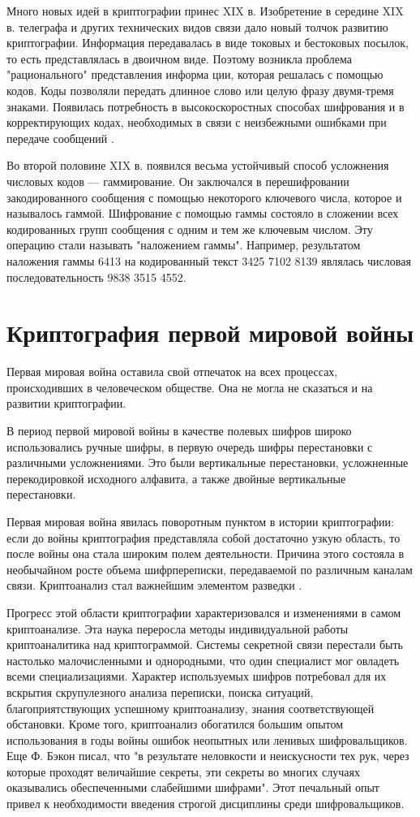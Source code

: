 Много новых идей в криптографии принес XIX в. Изобретение в середине XIX в. телеграфа и других технических видов связи дало новый толчок развитию криптографии. Информация передавалась в виде токовых и бестоковых посылок, то есть представлялась в двоичном виде. Поэтому возникла проблема "рационального" представления информа ции, которая решалась с помощью кодов. Коды позволяли передать длинное слово или целую фразу двумя-тремя знаками. Появилась потребность в высокоскоростных способах шифрования и в корректирующих кодах, необходимых в связи с неизбежными ошибками при передаче сообщений \cite{omran2011cryptanalytic}.

Во второй половине XIX в. появился весьма устойчивый способ усложнения числовых кодов — гаммирование. Он заключался в перешифровании закодированного сообщения с помощью некоторого ключевого числа, которое и называлось гаммой. Шифрование с помощью гаммы состояло в сложении всех кодированных групп сообщения с одним и тем же ключевым числом. Эту операцию стали называть "наложением гаммы". Например, результатом наложения гаммы 6413 на кодированный текст 3425 7102 8139 являлась числовая последовательность 9838 3515 4552.


\section{Криптография первой мировой войны}
Первая мировая война оставила свой отпечаток на всех процессах, происходивших в человеческом обществе. Она не могла не сказаться и на развитии криптографии.

В период первой мировой войны в качестве полевых шифров широко использовались ручные шифры, в первую очередь шифры перестановки с различными усложнениями. Это были вертикальные перестановки, усложненные перекодировкой исходного алфавита, а также двойные вертикальные перестановки.

Первая мировая война явилась поворотным пунктом в истории криптографии: если до войны криптография представляла собой достаточно узкую область, то после войны она стала широким полем деятельности. Причина этого состояла в необычайном росте объема шифрпереписки, передаваемой по различным каналам связи. Криптоанализ стал важнейшим элементом разведки \cite{d2006sov}.

Прогресс этой области криптографии характеризовался и изменениями в самом криптоанализе. Эта наука переросла методы индивидуальной работы криптоаналитика над криптограммой. Системы секретной связи перестали быть настолько малочисленными и однородными, что один специалист мог овладеть всеми специализациями. Характер используемых шифров потребовал для их вскрытия скрупулезного анализа переписки, поиска ситуаций, благоприятствующих успешному криптоанализу, знания соответствующей обстановки. Кроме того, криптоанализ обогатился большим опытом использования в годы войны ошибок неопытных или ленивых шифровальщиков. Еще Ф. Бэкон писал, что "в результате неловкости и неискусности тех рук, через которые проходят величайшие секреты, эти секреты во многих случаях оказывались обеспеченными слабейшими шифрами". Этот печальный опыт привел к необходимости введения строгой дисциплины среди шифровальщиков.

